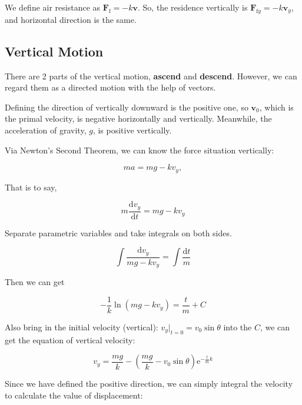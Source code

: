 \documentclass{article}
\begin{document}
We define air resistance as $\boldsymbol{F}_\mathrm{f}=-k\boldsymbol{v}$. So, the residence vertically is $\boldsymbol{F}_{\mathrm{f}y}=-k\boldsymbol{v}_y$, and horizontal direction is the same.

\subsection{Vertical Motion}

There are 2 parts of the vertical motion, \textbf{ascend} and \textbf{descend}. However, we can regard them as a directed motion with the help of vectors.

Defining the direction of vertically downward is the positive one, so $\boldsymbol{v}_0$, which is the primal velocity, is negative horizontally and vertically. Meanwhile, the acceleration of gravity, $g$, is positive vertically.

Via Newton's Second Theorem, we can know the force situation vertically:

\newcommand{\derive}{\mathrm{d}}

\begin{equation*}
    ma = mg - kv_y,
\end{equation*}

That is to say,

\begin{equation}
    m\dfrac{\derive v_y}{\derive t} = mg - kv_y
\end{equation}

Separate parametric variables and take integrals on both sides.

\begin{equation}
    \int\dfrac{\derive v_y}{mg - kv_y} = \int\dfrac{\derive t}{m}
\end{equation}

Then we can get

\begin{equation}
    -\dfrac{1}{k}\ln\left(mg-kv_y\right)=\dfrac{t}{m}+C
\end{equation}

Also bring in the initial velocity (vertical): $v_y\big\vert_{t=0}=v_0\sin\theta$ into the $C$, we can get the equation of vertical velocity:

\begin{equation}
    v_y=\dfrac{mg}{k}-\left(\dfrac{mg}{k}-v_0\sin\theta\right)\mathrm{e}^{-\frac{t}{m}k} \label{eq:vertical-velocity}
\end{equation}

Since we have defined the positive direction, we can simply integral the velocity to calculate the value of displacement:
\end{document}
